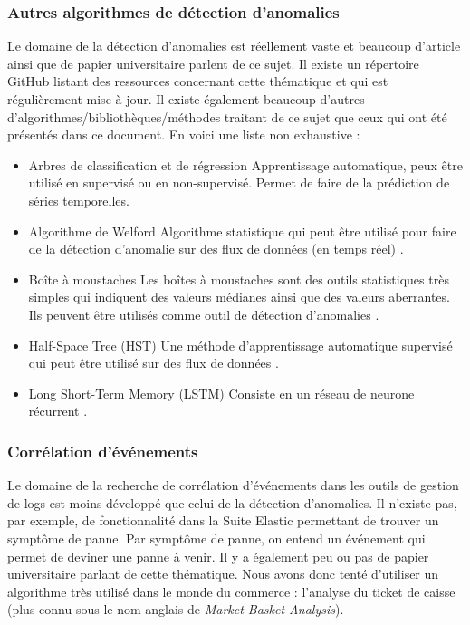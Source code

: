 \documentclass[paper=a4, fontsize=11pt]{scrartcl}
\begin{document}
\subsubsection{Autres algorithmes de détection d'anomalies}
Le domaine de la détection d'anomalies est réellement vaste et beaucoup d'article ainsi que de papier universitaire parlent de ce sujet. Il existe un répertoire GitHub \cite{zhao_yzhao062anomaly-detection-resources_2020} listant des ressources concernant cette thématique et qui est régulièrement mise à jour. Il existe également beaucoup d'autres d'algorithmes/bibliothèques/méthodes traitant de ce sujet que ceux qui ont été présentés dans ce document. En voici une liste non exhaustive :
\begin{itemize}
    \item Arbres de classification et de régression
    \subitem Apprentissage automatique, peux être utilisé en supervisé ou en non-supervisé. Permet de faire de la prédiction de séries temporelles.
    \item Algorithme de Welford
    \subitem Algorithme statistique qui peut être utilisé pour faire de la détection d'anomalie sur des flux de données (en temps réel) \cite{lobo_detecting_2020}.
    \item Boîte à moustaches
    \subitem Les boîtes à moustaches sont des outils statistiques très simples qui indiquent des valeurs médianes ainsi que des valeurs aberrantes. Ils peuvent être utilisés comme outil de détection d'anomalies \cite{lobo_detecting_2020}.
    \item Half-Space Tree (HST)
    \subitem Une méthode d'apprentissage automatique supervisé qui peut être utilisé sur des flux de données \cite{lobo_detecting_2020}.
    \item Long Short-Term Memory (LSTM)
    \subitem Consiste en un réseau de neurone récurrent \cite{noauthor_reseau_2020}.
\end{itemize}

\subsubsection{Corrélation d'événements}
Le domaine de la recherche de corrélation d'événements dans les outils de gestion de logs est moins développé que celui de la détection d'anomalies. Il n'existe pas, par exemple, de fonctionnalité dans la Suite Elastic permettant de trouver un \og symptôme \fg de panne. Par symptôme de panne, on entend un événement qui permet de deviner une panne à venir. Il y a également peu ou pas de papier universitaire parlant de cette thématique. Nous avons donc tenté d'utiliser un algorithme très utilisé dans le monde du commerce : l'analyse du ticket de caisse (plus connu sous le nom anglais de \textit{Market Basket Analysis}).
\end{document}
